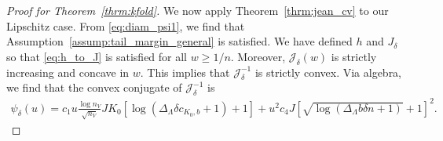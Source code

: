 \documentclass[10pt]{book}
\theoremstyle{definition}
\begin{document}
\begin{proof}[Proof for Theorem~\ref{thrm:kfold}]
	We now apply Theorem~\ref{thrm:jean_cv} to our Lipschitz case.
	From \eqref{eq:diam_psi1}, we find that Assumption~\ref{assump:tail_margin_general} is satisfied.
	We have defined $h$ and $J_\delta$ so that \eqref{eq:h_to_J} is satisfied for all $w \ge 1/n$.
	Moreover, $\mathcal{J}_{\delta}(w)$ is strictly increasing and concave in $w$.
	This implies that $\mathcal{J}_{\delta}^{-1}$ is strictly convex.
	Via algebra, we find that the convex conjugate of $\mathcal{J}_{\delta}^{-1}$ is
	\begin{align}
	\psi_{\delta}(u)
	= c_{1} u \frac{\log n_{V}}{\sqrt{n_{V}}}
	JK_0\left[\log\left(\Delta_{\Lambda}\delta c_{K_0, b}+1\right)+1\right]
	+ u^2 c_{4} J
	\left[\sqrt{\log\left(\Delta_{\Lambda}b \delta n +1\right)}+1\right]^2.
	\end{align}

\end{proof}
\end{document}
